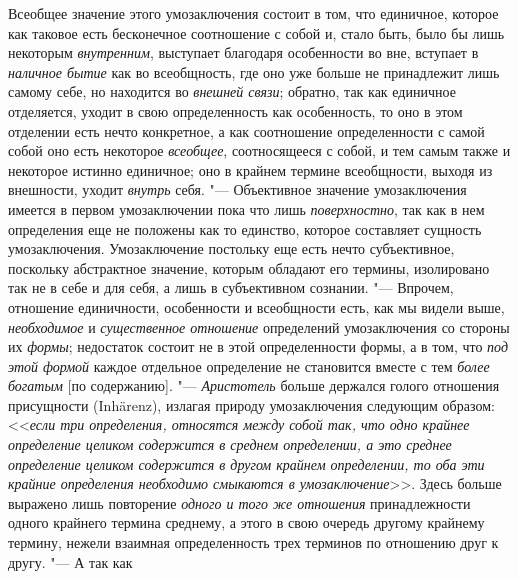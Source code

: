 Всеобщее значение этого умозаключения состоит в том, что
единичное, которое как таковое есть бесконечное соотношение с собой и,
стало быть, было бы лишь некоторым
{\em внутренним},
выступает благодаря особенности во вне, вступает в
{\em наличное бытие} как
во всеобщность, где оно уже больше не принадлежит лишь самому себе, но
находится во {\em внешней связи};
обратно, так как единичное отделяется, уходит в свою
определенность как особенность, то оно в этом отделении есть
нечто конкретное, а как соотношение определенности с самой собой оно есть
некоторое {\em всеобщее},
соотносящееся с собой, и тем самым также и некоторое истинно
единичное; оно в крайнем термине всеобщности, выходя из внешности, уходит
{\em внутрь} себя. "---
Объективное значение умозаключения имеется в первом
умозаключении пока что лишь
{\em поверхностно}, так
как в нем определения еще не положены как то единство, которое составляет
сущность умозаключения. Умозаключение постольку еще есть нечто
субъективное, поскольку абстрактное значение, которым обладают его термины,
изолировано так не в себе и для себя, а лишь в субъективном сознании. "---
Впрочем, отношение единичности, особенности и всеобщности
есть, как мы видели выше,
{\em необходимое} и
{\em существенное отношение}
определений умозаключения со стороны их
{\em формы}; недостаток
состоит не в этой определенности формы, а в том, что
{\em под этой формой}
каждое отдельное определение не становится вместе с тем
{\em более богатым} [по
содержанию]. "--- {\em Аристотель}
больше держался голого отношения присущности (Inhärenz),
излагая природу умозаключения следующим образом:
<<{\em если три определения, относятся
между собой так, что одно крайнее определение целиком содержится в среднем
определении, а это среднее определение целиком содержится в другом крайнем
определении, то оба эти крайние определения необходимо смыкаются в
умозаключение}>>.
Здесь больше выражено лишь повторение
{\em одного и того же отношения}
принадлежности одного крайнего термина среднему, а этого в
свою очередь другому крайнему термину, нежели взаимная определенность трех
терминов по отношению друг к другу. "--- А так как
